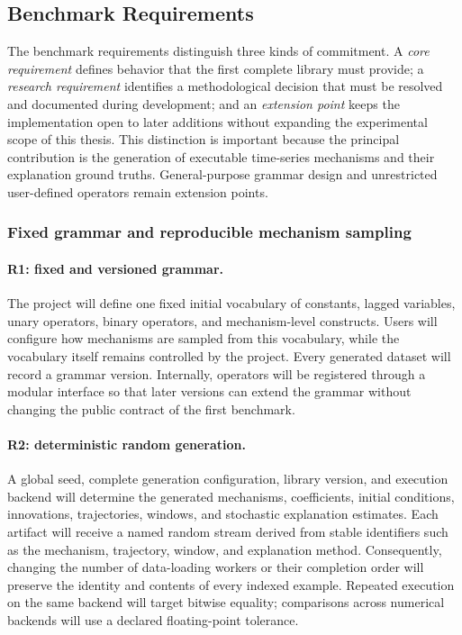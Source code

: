 \subsection{Benchmark Requirements}
\label{sec:benchmark-requirements}

The benchmark requirements distinguish three kinds of commitment. A
\emph{core requirement} defines behavior that the first complete library must
provide; a \emph{research requirement} identifies a methodological decision
that must be resolved and documented during development; and an
\emph{extension point} keeps the implementation open to later additions
without expanding the experimental scope of this thesis. This distinction is
important because the principal contribution is the generation of executable
time-series mechanisms and their explanation ground truths. General-purpose
grammar design and unrestricted user-defined operators remain extension
points.

\subsubsection{Fixed grammar and reproducible mechanism sampling}

\paragraph{R1: fixed and versioned grammar.}
The project will define one fixed initial vocabulary of constants, lagged
variables, unary operators, binary operators, and mechanism-level constructs.
Users will configure how mechanisms are sampled from this vocabulary, while
the vocabulary itself remains controlled by the project. Every generated
dataset will record a grammar version. Internally, operators will be
registered through a modular interface so that later versions can extend the
grammar without changing the public contract of the first benchmark.

\paragraph{R2: deterministic random generation.}
A global seed, complete generation configuration, library version, and
execution backend will determine the generated mechanisms, coefficients,
initial conditions, innovations, trajectories, windows, and stochastic
explanation estimates. Each artifact will receive a named random stream
derived from stable identifiers such as the mechanism, trajectory, window,
and explanation method. Consequently, changing the number of data-loading
workers or their completion order will preserve the identity and contents of
every indexed example. Repeated execution on the same backend will target
bitwise equality; comparisons across numerical backends will use a declared
floating-point tolerance.

